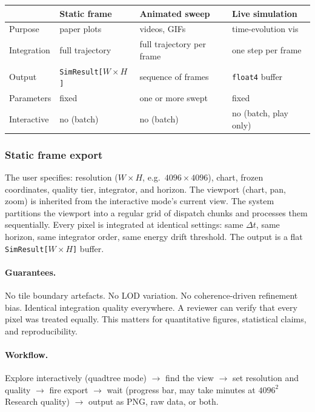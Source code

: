 \documentclass[11pt]{report}
\begin{document}
\begin{center}
\begin{tabular}{llll}
\toprule
& Static frame & Animated sweep & Live simulation \\
\midrule
Purpose & paper plots & videos, GIFs & time-evolution vis \\
Integration & full trajectory & full trajectory per frame & one step per frame \\
Output & \texttt{SimResult[$W \times H$]} & sequence of frames & \texttt{float4} buffer \\
Parameters & fixed & one or more swept & fixed \\
Interactive & no (batch) & no (batch) & no (batch, play only) \\
\bottomrule
\end{tabular}
\end{center}


\subsubsection{Static frame export}

The user specifies: resolution ($W\times H$, e.g.\ $4096\times 4096$), chart, frozen coordinates, quality tier, integrator, and horizon. The viewport (chart, pan, zoom) is inherited from the interactive mode's current view. The system partitions the viewport into a regular grid of dispatch chunks and processes them sequentially. Every pixel is integrated at identical settings: same $\Delta t$, same horizon, same integrator order, same energy drift threshold. The output is a flat \texttt{SimResult[$W\times H$]} buffer.

\paragraph{Guarantees.} No tile boundary artefacts. No LOD variation. No coherence-driven refinement bias. Identical integration quality everywhere. A reviewer can verify that every pixel was treated equally. This matters for quantitative figures, statistical claims, and reproducibility.

\paragraph{Workflow.} Explore interactively (quadtree mode) $\to$ find the view $\to$ set resolution and quality $\to$ fire export $\to$ wait (progress bar, may take minutes at $4096^2$ Research quality) $\to$ output as PNG, raw data, or both.
\end{document}
